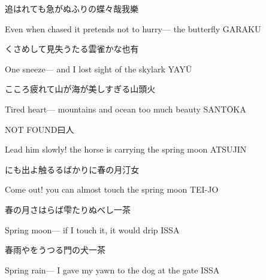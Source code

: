 \begin{haiku}
    {\FH 追はれても急がぬふりの蝶々哉}\hfill{\FH 我樂}

    \vin{} Even when chased
    \vin{} \vin{} it pretends not to hurry---
    \vin{} \vin{} \vin{} the butterfly \hspace{\fill} GARAKU
\end{haiku}

\begin{haiku}
    {\FH くさめして見失うたる雲雀かな}\hfill{\FH 也有}

    \vin{} One sneeze---
    \vin{} \vin{} and I lost sight of
    \vin{} \vin{} \vin{} the skylark \hspace{\fill} YAY\={U}
\end{haiku}

\begin{haiku}
    {\FH こころ疲れて山が海が美しすぎる}\hfill{\FH 山頭火}

    \vin{} Tired heart---
    \vin{} \vin{} mountains and ocean
    \vin{} \vin{} \vin{} too much beauty \hspace{\fill} SANT\={O}KA
\end{haiku}

\begin{haiku}
    NOT FOUND\hfill{\FH 曰人}

    \vin{} Lead him slowly!
    \vin{} \vin{} the horse is carrying
    \vin{} \vin{} \vin{} the spring moon \hspace{\fill} ATSUJIN
\end{haiku}

\begin{haiku}
    {\FH {}にも出よ触るるばかりに春の月}\hfill{\FH 汀女}

    \vin{} Come out!
    \vin{} \vin{} you can almost touch
    \vin{} \vin{} \vin{} the spring moon \hspace{\fill} TEI-JO
\end{haiku}

\begin{haiku}
    {\FH 春の月さはらば雫たりぬべし}\hfill{\FH 一茶}

    \vin{} Spring moon---
    \vin{} \vin{} if I touch it, it would
    \vin{} \vin{} \vin{} drip \hspace{\fill} ISSA
\end{haiku}

\begin{haiku}
    {\FH 春雨やをうつる門の犬}\hfill{\FH 一茶}

    \vin{} Spring rain---
    \vin{} \vin{} I gave my yawn
    \vin{} \vin{} \vin{} to the dog at the gate \hspace{\fill} ISSA
\end{haiku}

